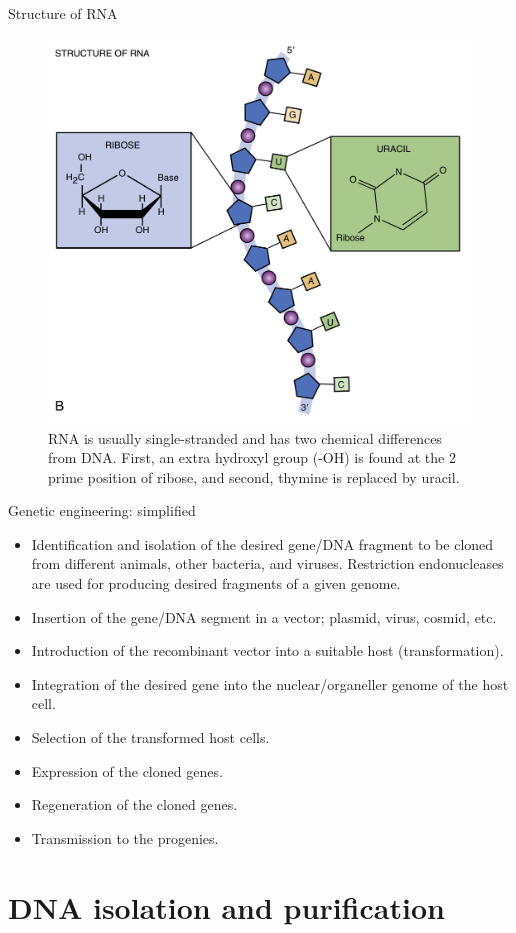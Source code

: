 \documentclass[
  ignorenonframetext,
  aspectratio=169]{beamer}
\providecommand{\tightlist}{%
  \setlength{\itemsep}{0pt}\setlength{\parskip}{0pt}}
\begin{document}
\begin{frame}{Structure of RNA}
\protect\hypertarget{structure-of-rna}{}
\begin{figure}
\includegraphics[width=0.45\linewidth]{./../images/dna_structure_b} \caption{RNA is usually single-stranded and has two chemical differences from DNA. First, an extra hydroxyl group (-OH) is found at the 2 prime position of ribose, and second, thymine is replaced by uracil.}\label{fig:nucleic-acid-rna}
\end{figure}
\end{frame}

\begin{frame}{Genetic engineering: simplified}
\protect\hypertarget{genetic-engineering-simplified}{}
\begin{itemize}
\tightlist
\item
  Identification and isolation of the desired gene/DNA fragment to be
  cloned from different animals, other bacteria, and viruses.
  Restriction endonucleases are used for producing desired fragments of
  a given genome.
\item
  Insertion of the gene/DNA segment in a vector; plasmid, virus, cosmid,
  etc.
\item
  Introduction of the recombinant vector into a suitable host
  (transformation).
\item
  Integration of the desired gene into the nuclear/organeller genome of
  the host cell.
\item
  Selection of the transformed host cells.
\item
  Expression of the cloned genes.
\item
  Regeneration of the cloned genes.
\item
  Transmission to the progenies.
\end{itemize}
\end{frame}

\hypertarget{dna-isolation-and-purification}{%
\section{DNA isolation and
purification}\label{dna-isolation-and-purification}}
\end{document}
